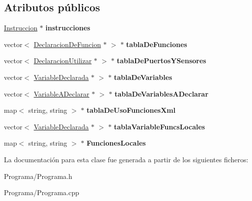 \subsection*{Atributos públicos}
\begin{DoxyCompactItemize}
\item 
\hypertarget{class_programa_a6d05116896e0f6fa979f788e376427a2}{\hyperlink{class_instruccion}{Instruccion} $\ast$ {\bfseries instrucciones}}\label{class_programa_a6d05116896e0f6fa979f788e376427a2}

\item 
\hypertarget{class_programa_a3c107344f717fa5ef382fac8be987d13}{vector$<$ \hyperlink{class_declaracion_de_funcion}{Declaracion\-De\-Funcion} $\ast$ $>$ $\ast$ {\bfseries tabla\-De\-Funciones}}\label{class_programa_a3c107344f717fa5ef382fac8be987d13}

\item 
\hypertarget{class_programa_a5bda451d9ac2192c9d59a25195a0d4b1}{vector$<$ \hyperlink{class_declaracion_utilizar}{Declaracion\-Utilizar} $\ast$ $>$ $\ast$ {\bfseries tabla\-De\-Puertos\-Y\-Sensores}}\label{class_programa_a5bda451d9ac2192c9d59a25195a0d4b1}

\item 
\hypertarget{class_programa_aaedf7a3c20bfc626d95663c809b1c4a2}{vector$<$ \hyperlink{class_variable_declarada}{Variable\-Declarada} $\ast$ $>$ $\ast$ {\bfseries tabla\-De\-Variables}}\label{class_programa_aaedf7a3c20bfc626d95663c809b1c4a2}

\item 
\hypertarget{class_programa_aa40316284c595e022382898aa2f78975}{vector$<$ \hyperlink{class_variable_a_declarar}{Variable\-A\-Declarar} $\ast$ $>$ $\ast$ {\bfseries tabla\-De\-Variables\-A\-Declarar}}\label{class_programa_aa40316284c595e022382898aa2f78975}

\item 
\hypertarget{class_programa_a9c2f470f143b51a810d4b39e59b9703d}{map$<$ string, string $>$ $\ast$ {\bfseries tabla\-De\-Uso\-Funciones\-Xml}}\label{class_programa_a9c2f470f143b51a810d4b39e59b9703d}

\item 
\hypertarget{class_programa_ac8e3e5a619b3e857dbd929018f27993c}{vector$<$ \hyperlink{class_variable_declarada}{Variable\-Declarada} $\ast$ $>$ $\ast$ {\bfseries tabla\-Variable\-Funcs\-Locales}}\label{class_programa_ac8e3e5a619b3e857dbd929018f27993c}

\item 
\hypertarget{class_programa_a28f377de8440f56b420cb63e6d829714}{map$<$ string, string $>$ $\ast$ {\bfseries Funciones\-Locales}}\label{class_programa_a28f377de8440f56b420cb63e6d829714}

\end{DoxyCompactItemize}


La documentación para esta clase fue generada a partir de los siguientes ficheros\-:\begin{DoxyCompactItemize}
\item 
Programa/Programa.\-h\item 
Programa/Programa.\-cpp\end{DoxyCompactItemize}
